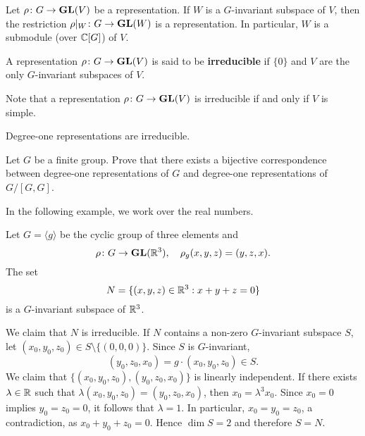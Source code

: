 Let $\rho\colon G\to\mathbf{GL}(V)$ be a representation. 
If $W$ is a $G$-invariant subspace of $V$, 
then the restriction $\rho|_W\colon G\to\mathbf{GL}(W)$
is a representation. In particular, $W$ is a submodule (over $\mathbb{C}[G]$) 
of $V$. 

\begin{definition}
    A representation $\rho\colon G\to\mathbf{GL}(V)$ is 
    said to be \textbf{irreducible} if 
    $\{0\}$ and $V$ are the only 
    $G$-invariant subspaces of $V$. 
\end{definition}

Note that a representation $\rho\colon G\to\mathbf{GL}(V)$ is irreducible
if and only if $V$ is simple. 

\begin{example}
    Degree-one representations are irreducible. 
\end{example}

\begin{exercise}
\label{xca:degree-one}
    Let $G$ be a finite group. 
    Prove that there exists a bijective correspondence between 
    degree-one representations of $G$ and 
    degree-one representations of $G/[G,G]$. 
\end{exercise}

In the following example, we work over the real numbers. 

\begin{example}
Let $G=\langle g\rangle$ be the cyclic group of three elements and 
\[
\rho\colon G\to\mathbf{GL}(\mathbb{R}^3),\quad
\rho_g(x,y,z)=(y,z,x).
\]
The set 
\[
N=\{(x,y,z)\in\mathbb{R}^{3}:x+y+z=0\}
\]
is a $G$-invariant subspace of $\mathbb{R}^3$. 

We claim that $N$ is irreducible. 
If $N$ contains a non-zero $G$-invariant subspace $S$, 
let $(x_0,y_0,z_0)\in S\setminus\{(0,0,0)\}$. Since $S$ is $G$-invariant, 
\[
(y_0,z_0,x_0)=g\cdot (x_0,y_0,z_0)\in S. 
\]
We claim that $\{(x_0,y_0,z_0),(y_0,z_0,x_0)\}$ is linearly independent. If there exists $\lambda\in\mathbb{R}$ 
such that $\lambda(x_0,y_0,z_0)=(y_0,z_0,x_0)$, then $x_0=\lambda^3 x_0$. Since $x_0=0$ implies 
$y_0=z_0=0$, it follows that $\lambda=1$. In particular, $x_0=y_0=z_0$, a contradiction, as $x_0+y_0+z_0=0$. 
Hence $\dim S=2$ and therefore $S=N$. 
\end{example}

